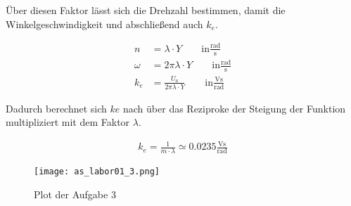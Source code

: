 Über diesen Faktor lässt sich die Drehzahl bestimmen, damit die
Winkelgeschwindigkeit und abschließend auch $k_e$.

\begin{equation} \label{eq133}
    \begin{split}
        n &= \lambda \cdot Y \qquad \text{in} \mathrm{\frac{rad}{s}}\\
        \omega &= 2 \pi \lambda \cdot Y \qquad \text{in} \mathrm{\frac{rad}{s}}\\
        k_e &= \frac{U_a}{2 \pi \lambda \cdot Y}  \qquad \text{in} \mathrm{\frac{Vs}{rad}}
    \end{split}
\end{equation}

Dadurch berechnet sich $ke$ nach über das Reziproke der Steigung der Funktion
multipliziert mit dem Faktor $\lambda$.

\begin{equation} \label{eq134}
    \begin{split}
    k_e = \frac{1}{m \cdot \lambda} \simeq 0.0235 \mathrm{\frac{Vs}{rad}}
    \end{split}
\end{equation}

\begin{figure}[H]
 \centering
 \texttt{[image: as\_labor01\_3.png]}
 \caption{Plot der Aufgabe 3}
 \label{fig:PlotAufgabe3}
\end{figure}